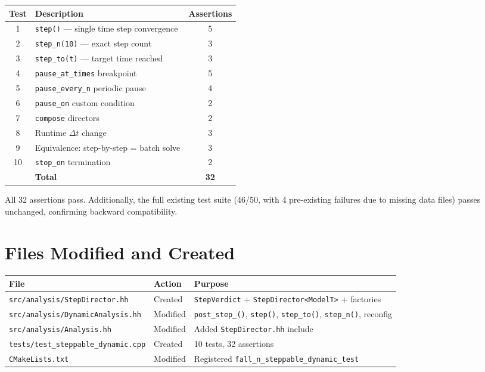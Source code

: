 \begin{center}
\begin{tabular}{clc}
  \toprule
  Test & Description & Assertions \\
  \midrule
  1  & \texttt{step()} — single time step convergence & 5 \\
  2  & \texttt{step\_n(10)} — exact step count         & 3 \\
  3  & \texttt{step\_to(t)} — target time reached       & 3 \\
  4  & \texttt{pause\_at\_times} breakpoint             & 5 \\
  5  & \texttt{pause\_every\_n} periodic pause          & 4 \\
  6  & \texttt{pause\_on} custom condition              & 2 \\
  7  & \texttt{compose} directors                       & 2 \\
  8  & Runtime $\Delta t$ change                        & 3 \\
  9  & Equivalence: step-by-step = batch solve          & 3 \\
  10 & \texttt{stop\_on} termination                    & 2 \\
  \midrule
     & \textbf{Total}                                   & \textbf{32} \\
  \bottomrule
\end{tabular}
\end{center}

All 32 assertions pass.  Additionally, the full existing test suite
(46/50, with 4 pre-existing failures due to missing data files) passes
unchanged, confirming backward compatibility.

\section{Files Modified and Created}
\label{sec:sd-files}

\begin{center}
\begin{tabular}{lll}
  \toprule
  File & Action & Purpose \\
  \midrule
  \texttt{src/analysis/StepDirector.hh} & Created &
    \texttt{StepVerdict} + \texttt{StepDirector<ModelT>} + factories \\
  \texttt{src/analysis/DynamicAnalysis.hh} & Modified &
    \texttt{post\_step\_()}, \texttt{step()}, \texttt{step\_to()},
    \texttt{step\_n()}, reconfig \\
  \texttt{src/analysis/Analysis.hh} & Modified &
    Added \texttt{StepDirector.hh} include \\
  \texttt{tests/test\_steppable\_dynamic.cpp} & Created &
    10 tests, 32 assertions \\
  \texttt{CMakeLists.txt} & Modified &
    Registered \texttt{fall\_n\_steppable\_dynamic\_test} \\
  \bottomrule
\end{tabular}
\end{center}

